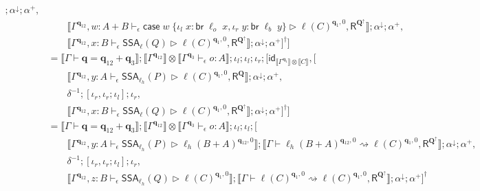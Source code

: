 \documentclass[acmsmall,screen,review]{acmart}
\newcommand{\mb}[1]{\ensuremath{\mathbf{#1}}}
\newcommand{\ms}[1]{\ensuremath{\mathsf{#1}}}
\newcommand{\lto}{:}
\newcommand{\linl}[1]{\iota_l\;{#1}}
\newcommand{\linr}[1]{\iota_r\;{#1}}
\newcommand{\caseexpr}[5]{\ms{case}\;#1\;\{\linl{#2} \lto #3, \linr{#4} \lto #5\}}
\newcommand{\brb}[2]{\ms{br}\;#1\;#2}
\newcommand{\qsp}[4]{#1 \vdash #2 = #3 + #4}
\newcommand{\lwk}[3]{#1 \vdash #2 \rightsquigarrow #3}
\newcommand{\hasty}[4]{#1 \vdash_{#2} #3: {#4}}
\newcommand{\haslb}[4]{#1 \vdash_{#2} #3 \rhd #4}
\newcommand{\tossa}[2]{\ms{SSA}_{#1}(#2)}
\newcommand{\dnt}[1]{\llbracket{#1}\rrbracket}
\newcommand{\zeroqv}[1]{#1^\uparrow}
\begin{document}
\begin{itemize}
\begin{align*}
{{        }
      } ; \alpha^\downarrow ; \alpha^+, \\ & \qquad
      \dnt{\haslb{\Gamma^{\mb{q}_{12}}, w : A + B}{\epsilon}
        {\caseexpr{w}{x}{\brb{\ell_o}{x}}{y}{\brb{\ell_b}{y}}}
        {
          \ell(C)^{\mb{q}_1, 0}, 
          \ms{R}^{\zeroqv{\mb{Q}}}
        }
      } ; \alpha^\downarrow ; \alpha^+, \\ & \qquad
      \dnt{\haslb{\Gamma^{\mb{q}_{12}}, x : B}{\epsilon}
        {\tossa{\ell}{Q}}
        {
          \ell(C)^{\mb{q}_1, 0}, 
          \ms{R}^{\zeroqv{\mb{Q}}}
        }
      } ; \alpha^\downarrow ; \alpha^+
    ]^\dagger] \\
  &= \dnt{\qsp{\Gamma}{\mb{q}}{\mb{q}_{12}}{\mb{q}_3}}
      ; \dnt{\Gamma^{\mb{q}_{12}}} 
        \otimes \dnt{\hasty{\Gamma^{\mb{q}_3}}{\epsilon}{o}{A}}
      ; \iota_l ; \iota_l ; \iota_r
      ; [\ms{id}_{\dnt{\Gamma^{\mb{q}_1}} \otimes \dnt{C}}, [\\ & \qquad
      \dnt{\haslb{\Gamma^{\mb{q}_{12}}, y : A}{\epsilon}{\tossa{\ell_h}{P}}
        {
          \ell(C)^{\mb{q}_1, 0}, 
          \ms{R}^{\mb{Q}}
        }
      } ; \alpha^\downarrow ; \alpha^+, \\ & \qquad
      \delta^{-1} ; [\iota_r, \iota_r ; \iota_l] ; \iota_r, \\ & \qquad
      \dnt{\haslb{\Gamma^{\mb{q}_{12}}, x : B}{\epsilon}
        {\tossa{\ell}{Q}}
        {
          \ell(C)^{\mb{q}_1, 0}, 
          \ms{R}^{\zeroqv{\mb{Q}}}
        }
      } ; \alpha^\downarrow ; \alpha^+
    ]^\dagger] \\
  &= \dnt{\qsp{\Gamma}{\mb{q}}{\mb{q}_{12}}{\mb{q}_3}}
      ; \dnt{\Gamma^{\mb{q}_{12}}} 
        \otimes \dnt{\hasty{\Gamma^{\mb{q}_3}}{\epsilon}{o}{A}}
      ; \iota_l ; \iota_l
      ; [\\ & \qquad
      \dnt{
        \haslb{\Gamma^{\mb{q}_{12}}, y : A}{\epsilon}{\tossa{\ell_h}{P}}
          {\ell_h(B + A)^{\mb{q}_{12}, 0}}
      }
      ; \dnt{\lwk{\Gamma}{\ell_h(B + A)^{\mb{q}_{12}, 0}}
              {\ell(C)^{\mb{q}_1, 0}, \ms{R}^{\zeroqv{\mb{Q}}}}} 
      ; \alpha^\downarrow ; \alpha^+,
      \\ & \qquad
      \delta^{-1} ; [\iota_r, \iota_r ; \iota_l] ; \iota_r, \\ & \qquad
      \dnt{
        \haslb{\Gamma^{\mb{q}_{12}}, z : B}{\epsilon}{\tossa{\ell_h}{Q}}{\ell(C)^{\mb{q}_1, 0}}
      }
      ; \dnt{\lwk{\Gamma}{\ell(C)^{\mb{q}_1, 0}}\ell(C)^{\mb{q}_1, 0}, {\ms{R}^{\zeroqv{\mb{Q}}}}} 
      ; \alpha^\downarrow ; \alpha^+
    ]^\dagger \\

\end{align*}
\end{itemize}
\end{document}
